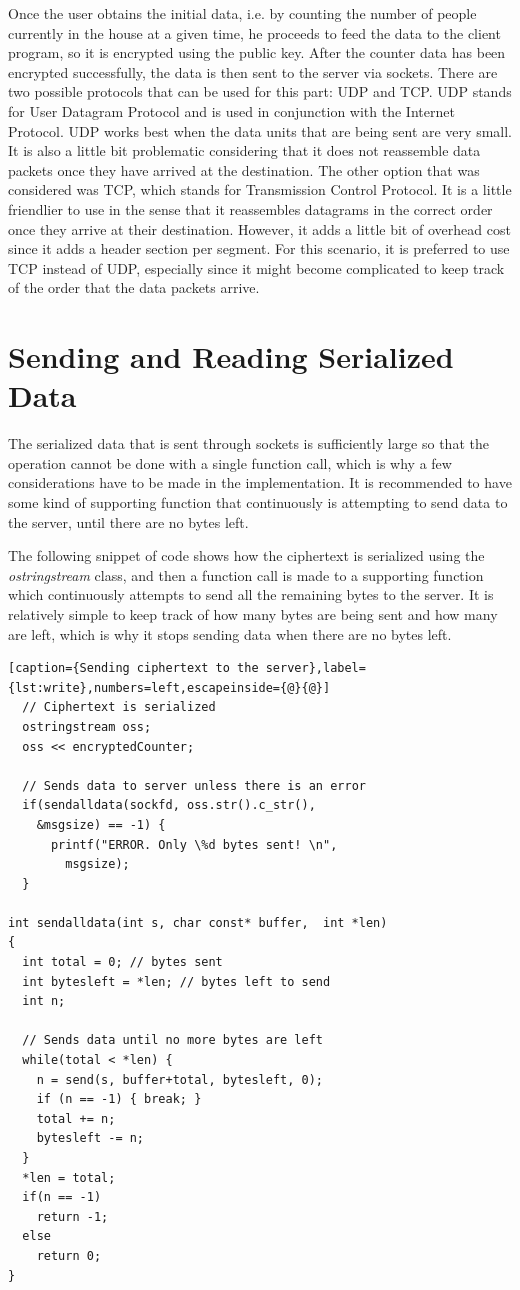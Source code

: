 Once the user obtains the initial data, i.e. by counting the number of people currently in the house at a given time, he proceeds to feed the data to the client program, so it is encrypted using the public key. After the counter data has been encrypted successfully, the data is then sent to the server via sockets. There are two possible protocols that can be used for this part: UDP and TCP. UDP stands for User Datagram Protocol and is used in conjunction with the Internet Protocol. UDP works best when the data units that are being sent are very small. It is also a little bit problematic considering that it does not reassemble data packets once they have arrived at the destination. The other option that was considered was TCP, which stands for Transmission Control Protocol. It is a little friendlier to use in the sense that it reassembles datagrams in the correct order once they arrive at their destination. However, it adds a little bit of overhead cost since it adds a header section per segment. For this scenario, it is preferred to use TCP instead of UDP, especially since it might become complicated to keep track of the order that the data packets arrive.

\section{{Sending and Reading Serialized Data}}

The serialized data that is sent through sockets is sufficiently large so that the operation cannot be done with a single function call, which is why a few considerations have to be made in the implementation. It is recommended to have some kind of supporting function that continuously is attempting to send data to the server, until there are no bytes left.

The following snippet of code shows how the ciphertext is serialized using the \textit{ostringstream} class, and then a function call is made to a supporting function which continuously attempts to send all the remaining bytes to the server. It is relatively simple to keep track of how many bytes are being sent and how many are left, which is why it stops sending data when there are no bytes left.
\begin{lstlisting}[caption={Sending ciphertext to the server},label={lst:write},numbers=left,escapeinside={@}{@}]
  // Ciphertext is serialized
  ostringstream oss;
  oss << encryptedCounter;
  
  // Sends data to server unless there is an error
  if(sendalldata(sockfd, oss.str().c_str(), 
    &msgsize) == -1) {
      printf("ERROR. Only \%d bytes sent! \n", 
        msgsize);
  }

int sendalldata(int s, char const* buffer,  int *len)
{
  int total = 0; // bytes sent
  int bytesleft = *len; // bytes left to send
  int n;
  
  // Sends data until no more bytes are left
  while(total < *len) {
    n = send(s, buffer+total, bytesleft, 0);
    if (n == -1) { break; }
    total += n;
    bytesleft -= n;
  }
  *len = total; 
  if(n == -1) 
    return -1;
  else 
    return 0;
}
\end{lstlisting}

